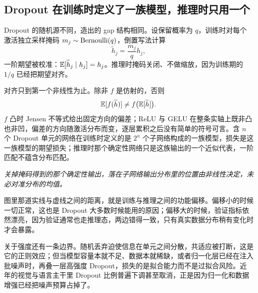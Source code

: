 \subsection{Dropout 在训练时定义了一族模型，推理时只用一个}

Dropout 的随机源不同，造出的 gap 结构相同。设保留概率为 \(q\)，训练时对每个激活独立采样掩码 \(m_j\sim\operatorname{Bernoulli}(q)\)，倒置写法计算
\[
\widetilde h_j=\frac{m_j}{q}h_j,
\]
一阶期望被校准：\(\mathbb{E}[\widetilde h_j\mid h_j]=h_j\)。推理时掩码关闭、不做缩放，因为训练期的 \(1/q\) 已经把期望对齐。

对齐只到第一个非线性为止。除非 \(f\) 是仿射的，否则
\[
\mathbb{E}[f(\widetilde h)]\neq f\bigl(\mathbb{E}[\widetilde h]\bigr).
\]
\(f\) 凸时 Jensen 不等式给出固定方向的偏差；ReLU 与 GELU 在整条实轴上既非凸也非凹，偏差的方向随激活分布而变，逐层累积之后没有简单的符号可言。含 \(n\) 个 Dropout 单元的网络在训练时定义的是 \(2^n\) 个子网络构成的一族模型，损失是这一族模型的期望损失；推理时那个确定性网络只是这族输出的一个近似代表，一阶匹配不蕴含分布匹配。

\begin{center}
\end{center}

\emph{关掉掩码得到的那个确定性输出，落在子网络输出分布里的位置由非线性决定，未必对准分布的均值。}

图里那道实线与虚线之间的距离，就是训练与推理之间的功能偏移。偏移小的时候一切正常，这也是 Dropout 大多数时候能用的原因；偏移大的时候，验证指标依然漂亮，因为验证通常也走推理态，两边错得一致，只有真实数据分布稍有变化时才会暴露。

关于强度还有一条边界。随机丢弃迫使信息在单元之间分散，共适应被打断，这是它的正则效应；但当模型容量本就不足、数据本就稀缺，或者归一化层已经在注入批噪声时，再叠一层高强度 Dropout，损失的是拟合能力而不是过拟合风险。近年的视觉与语言主干里 Dropout 比例普遍下调甚至取消，正是因为归一化和数据增强已经把噪声预算占掉了。

